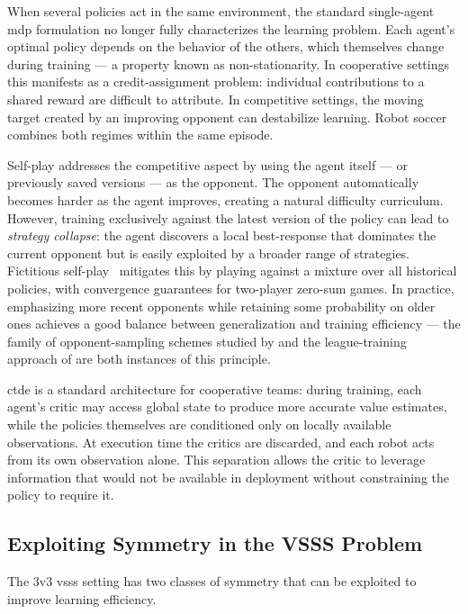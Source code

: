 When several policies act in the same environment, the standard single-agent
\gls{mdp} formulation no longer fully characterizes the learning problem.  Each
agent's optimal policy depends on the behavior of the others, which themselves
change during training — a property known as non-stationarity.  In cooperative
settings this manifests as a credit-assignment problem: individual contributions
to a shared reward are difficult to attribute.  In competitive settings, the
moving target created by an improving opponent can destabilize learning.  Robot
soccer combines both regimes within the same episode.

Self-play addresses the competitive aspect by using the agent itself — or
previously saved versions — as the opponent.  The opponent automatically
becomes harder as the agent improves, creating a natural difficulty curriculum.
However, training exclusively against the latest version of the policy can lead
to \emph{strategy collapse}: the agent discovers a local best-response that
dominates the current opponent but is easily exploited by a broader range of
strategies.  Fictitious self-play~\cite{brown1951fp} mitigates this by playing
against a mixture over all historical policies, with convergence guarantees for
two-player zero-sum games.  In practice, emphasizing more recent opponents
while retaining some probability on older ones achieves a good balance between
generalization and training efficiency — the family of opponent-sampling
schemes studied by \cite{master_thay} and the league-training approach of
\cite{starcraft_marl} are both instances of this principle.

\gls{ctde} is a standard architecture for cooperative teams: during training,
each agent's critic may access global state to produce more accurate value
estimates, while the policies themselves are conditioned only on locally
available observations.  At execution time the critics are discarded, and each
robot acts from its own observation alone.  This separation allows the critic
to leverage information that would not be available in deployment without
constraining the policy to require it.

\subsection{Exploiting Symmetry in the VSSS Problem}

The 3v3 \gls{vsss} setting has two classes of symmetry that can be exploited
to improve learning efficiency.


